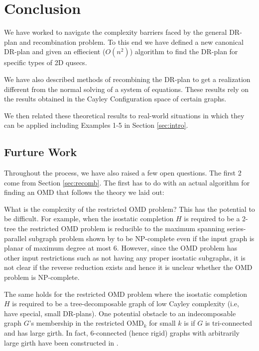 \section{Conclusion}


We have worked to navigate the complexity barriers faced by the general DR-plan and recombination problem. To this end we have defined a new canonical DR-plan and given an effiecient ($O(n^2)$) algorithm to find the DR-plan for specific types of 2D qusecs.

We have also described methods of recombining the DR-plan to get a realization different from the normal solving of a system of equations. These results rely on the results obtained in the Cayley Configuration space of certain graphs. 

We then related these theoretical results to real-world situations in which they can be applied including Examples 1-5 in Section \ref{sec:intro}. 

\subsection{Furture Work}
Throughout the process, we have also raised a few open questions. The first 2 come from Section \ref{sec:recomb}. The first has to do with an actual algorithm for finding an OMD that follows the theory we laid out:

\begin{openproblem}    
What is the complexity of the restricted OMD problem?
This has the potential to be difficult. For example, when the
isostatic completion $H$ is required to be a 2-tree the restricted OMD
problem is reducible to the maximum spanning series-parallel subgraph
problem shown by \cite{cai1993spanning} to be NP-complete even if the input
graph is planar of maximum degree at most 6. However, since the OMD
problem has other input restrictions such as not having any proper
isostatic subgraphs, it is not clear if the reverse reduction exists
and hence it is unclear whether the OMD problem is NP-complete. 

The same holds for the restricted OMD problem where the isostatic
completion $H$ is required to be a tree-decomposable graph of low
Cayley complexity (i.e, have special, small DR-plans). One potential
obstacle to an indecomposable graph $G$'s membership in the restricted
OMD$_k$ for small $k$ is if $G$ is tri-connected and has large girth.
In fact, 6-connected (hence rigid) graphs with arbitrarily large girth
have been constructed in \cite{servatius2000rigidity}.
\end{openproblem}

